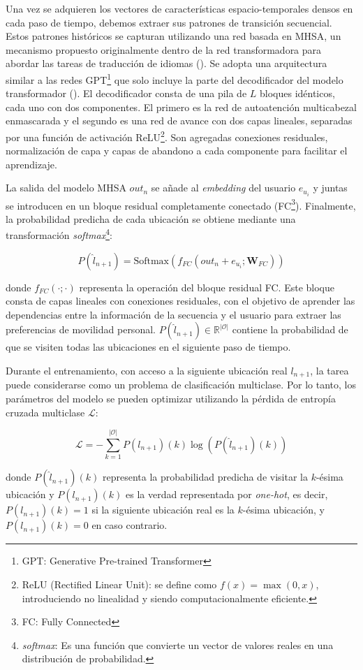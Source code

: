 Una vez se adquieren los vectores de características 
espacio-temporales densos en cada paso de tiempo, debemos extraer 
sus patrones de transición secuencial. Estos patrones históricos 
se capturan utilizando una red basada en MHSA, un mecanismo 
propuesto originalmente dentro de la red transformadora para 
abordar las tareas de traducción de idiomas (\cite{vaswani2017attention}). 
Se adopta una arquitectura similar a las redes GPT\footnote{GPT: Generative Pre-trained Transformer} que solo incluye la parte del decodificador 
del modelo transformador (\cite{radford2018improving}). El decodificador 
consta de una pila de \(L\) bloques idénticos, cada uno con dos 
componentes. El primero es la red de autoatención multicabezal enmascarada 
y el segundo es una red de avance con dos capas lineales, 
separadas por una función de activación ReLU\footnote{ReLU 
(Rectified Linear Unit): se define como 
$f(x) = \max(0, x)$, introduciendo no linealidad y siendo 
computacionalmente eficiente.}. Son agregadas
conexiones residuales, normalización de capa y capas de abandono 
a cada componente para facilitar el aprendizaje. 

La salida del modelo MHSA \(out_n\) se añade al \textit{embedding} del 
usuario \(e_{u_i}\) y juntas se introducen en un bloque residual 
completamente conectado (FC\footnote{FC: Fully Connected}). Finalmente, 
la probabilidad 
predicha de cada ubicación se obtiene mediante una transformación 
\textit{softmax}\footnote{\textit{softmax}: Es una función que convierte 
un vector de valores reales en una distribución de probabilidad.}:

\begin{equation}
P(\hat{l}_{n+1}) = \text{Softmax}(f_{FC}(out_n + e_{u_i}; \mathbf{W}_{FC}))  \tag{3}
\label{ec:3}
\end{equation}

donde \(f_{FC}(\cdot; \cdot)\) representa la operación del 
bloque residual FC. Este bloque consta de capas lineales con 
conexiones residuales, con el objetivo de aprender las dependencias 
entre la información de la secuencia y el usuario para extraer 
las preferencias de movilidad personal. 
\(P(\hat{l}_{n+1}) \in \mathbb{R}^{|\mathcal{O}|}\) contiene la 
probabilidad de que se visiten todas las ubicaciones en el 
siguiente paso de tiempo.

Durante el entrenamiento, con acceso a la siguiente ubicación 
real \(l_{n+1}\), la tarea puede considerarse como un problema de 
clasificación multiclase. Por lo tanto, los parámetros del modelo 
se pueden optimizar utilizando la pérdida de entropía cruzada 
multiclase \(\mathcal{L}\):

\begin{equation}
\mathcal{L} = -\sum_{k=1}^{|\mathcal{O}|} P(l_{n+1})(k) \log(P(\hat{l}_{n+1})(k)) \tag{4}
\label{eq:4}
\end{equation}

donde \(P(\hat{l}_{n+1})(k)\) representa la probabilidad predicha 
de visitar la \(k\)-ésima ubicación y \(P(l_{n+1})(k)\) es la verdad 
representada por \textit{one-hot}, es decir, 
\(P(l_{n+1})(k) = 1\) si la siguiente ubicación real es la 
\(k\)-ésima ubicación, y \(P(l_{n+1})(k) = 0\) en caso contrario.